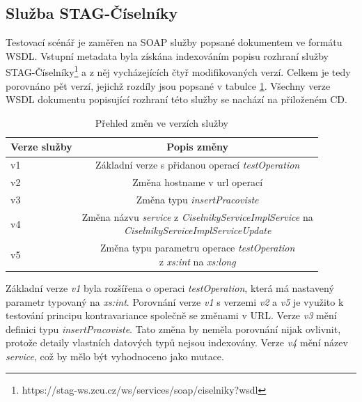\documentclass[czech,DP]{thesiskiv}
\begin{document}
\subsection{Služba STAG-Číselníky}

Testovací scénář je zaměřen na SOAP služby popsané dokumentem ve formátu WSDL. Vstupní metadata byla získána indexováním popisu rozhraní služby STAG-Číselníky\footnote{https://stag-ws.zcu.cz/ws/services/soap/ciselniky?wsdl} a z něj vycházejících čtyř modifikovaných verzí. Celkem je tedy porovnáno pět verzí, jejichž rozdíly jsou popsané v tabulce \ref{tab:wsdl-diffs}. Všechny verze WSDL dokumentu popisující rozhraní této služby se nachází na přiloženém CD.

\begin{table}[h]
	\centering
	\begin{tabular}{|l|c|}
		\hline
		Verze služby & Popis změny \\
		\hline
		\hline
		v1 & Základní verze s přidanou operací \textit{testOperation} \\
		\hline
		v2 & Změna hostname v url operací \\
		\hline
		v3 & Změna typu \textit{insertPracoviste} \\
		\hline
		v4 & \makecell{Změna názvu \textit{service} z \textit{CiselnikyServiceImplService} na \\ \textit{CiselnikyServiceImplServiceUpdate}}  \\
		\hline
		v5 & \makecell{Změna typu parametru operace \textit{testOperation} \\
		z \textit{xs:int} na \textit{xs:long}} \\ \hline
	\end{tabular}
	\caption{Přehled změn ve verzích služby}
	\label{tab:wsdl-diffs}
\end{table}

Základní verze \textit{v1} byla rozšířena o operaci \textit{testOperation}, která má nastavený parametr typovaný na \textit{xs:int}. Porovnání verze \textit{v1} s verzemi \textit{v2} a \textit{v5} je využito k testování principu kontravariance společně se změnami v URL. Verze \textit{v3} mění definici typu \textit{insertPracoviste}. Tato změna by neměla porovnání nijak ovlivnit, protože detaily vlastních datových typů nejsou indexovány. Verze \textit{v4} mění název \textit{service}, což by mělo být vyhodnoceno jako mutace.
\end{document}
